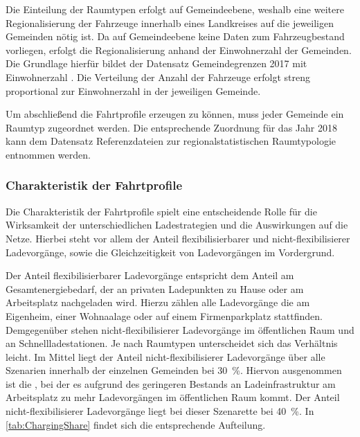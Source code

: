 Die Einteilung der \Regiostar Raumtypen erfolgt auf Gemeindeebene, weshalb eine weitere Regionalisierung der Fahrzeuge innerhalb eines Landkreises auf die jeweiligen Gemeinden nötig ist.
Da auf Gemeindeebene keine Daten zum Fahrzeugbestand vorliegen, erfolgt die Regionalisierung anhand der Einwohnerzahl der Gemeinden.
Die Grundlage hierfür bildet der Datensatz \glqq Gemeindegrenzen 2017 mit Einwohnerzahl\grqq{} \cite[][Stand: ]{EDG2020}.
Die Verteilung der Anzahl der Fahrzeuge erfolgt streng proportional zur Einwohnerzahl in der jeweiligen Gemeinde.\medskip

Um abschließend die Fahrtprofile erzeugen zu können, muss jeder Gemeinde ein \Regiostar Raumtyp zugeordnet werden.
Die entsprechende Zuordnung für das Jahr \num{2018} kann dem Datensatz \glqq Referenzdateien zur regionalstatistischen Raumtypologie\grqq{} \cite[][Stand: ]{BMVIa2020} entnommen werden.


\subsubsection{Charakteristik der Fahrtprofile}

Die Charakteristik der Fahrtprofile spielt eine entscheidende Rolle für die Wirksamkeit der unterschiedlichen Ladestrategien und die Auswirkungen auf die Netze.
Hierbei steht vor allem der Anteil flexibilisierbarer und nicht-flexibilisierer Ladevorgänge, sowie die Gleichzeitigkeit von Ladevorgängen im Vordergrund.\medskip

Der Anteil flexibilisierbarer Ladevorgänge entspricht dem Anteil am Gesamtenergiebedarf, der an privaten Ladepunkten zu Hause oder am Arbeitsplatz nachgeladen wird.
Hierzu zählen alle Ladevorgänge die am Eigenheim, einer Wohnaalage oder auf einem Firmenparkplatz stattfinden.
Demgegenüber stehen nicht-flexibilisierer Ladevorgänge im öffentlichen Raum und an Schnellladestationen.
Je nach Raumtypen unterscheidet sich das Verhältnis leicht.
Im Mittel liegt der Anteil nicht-flexibilisierer Ladevorgänge über alle Szenarien innerhalb der einzelnen Gemeinden bei \SI{30}{\percent}.
Hiervon ausgenommen ist die \SzeFirmenparkplatzdot, bei der es aufgrund des geringeren Bestands an Ladeinfrastruktur am Arbeitsplatz zu mehr Ladevorgängen im öffentlichen Raum kommt.
Der Anteil nicht-flexibilisierer Ladevorgänge liegt bei dieser Szenarette bei \SI{40}{\percent}.
In \autoref{tab:ChargingShare} findet sich die entsprechende Aufteilung.

